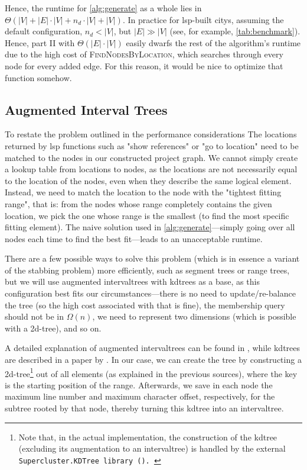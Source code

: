 \documentclass[../thesis]{subfiles}
\begin{document}
Hence, the runtime for \cref{alg:generate} as a whole lies in $\Theta(|V| + |E| \cdot |V| + n_d \cdot |V| + |V|)$.
In practice for \gls{lsp}-built \glspl{city}, assuming the default configuration, $n_d < |V|$, but $|E| \gg |V|$ (see, for example, \cref{tab:benchmark}).
Hence, part II with $\Theta(|E| \cdot |V|)$ easily dwarfs the rest of the algorithm's runtime due to the high cost of \textsc{FindNodesByLocation}, which searches through every node for every added edge.
For this reason, it would be nice to optimize that function somehow.

\subsection{Augmented Interval Trees}\label{subsec:kd}
To restate the problem outlined in the performance considerations 
The locations returned by \gls{lsp} functions such as "show references" or "go to location" need to be matched to the nodes in our constructed project graph.
We cannot simply create a lookup table from locations to nodes, as the locations are not necessarily equal to the location of the nodes, even when they describe the same logical element.
Instead, we need to match the location to the node with the "tightest fitting range",
that is: from the nodes whose \gls{range} completely contains the given location, we pick the one whose \gls{range} is the smallest (to find the most specific fitting element).
The naive solution used in \cref{alg:generate}---simply going over all nodes each time to find the best fit---leads to an unacceptable runtime.

There are a few possible ways to solve this problem (which is in essence a variant of the stabbing problem) more efficiently, such as segment trees or range trees, but we will use augmented \glspl{intervaltree} with \glspl{kdtree} as a base, as this configuration best fits our circumstances—there is no need to update/re-balance the tree (so the high cost associated with that is fine), the membership query should not be in $\Omega(n)$, we need to represent two dimensions (which is possible with a 2d-tree), and so on.

A detailed explanation of augmented \glspl{intervaltree} can be found in \textcite[section~17.3]{cormen2022}, while \glspl{kdtree} are described in a paper by \textcite{bentley1975}.
In our case, we can create the tree by constructing a 2d-tree\footnote{
	Note that, in the actual implementation, the construction of the \gls{kdtree} (excluding its augmentation to an \gls{intervaltree}) is handled by the external \tt{Supercluster.KDTree} library ().
} out of all elements (as explained in the previous sources), where the key is the starting position of the \gls{range}.
Afterwards, we save in each node the maximum line number and maximum character offset, respectively, for the subtree rooted by that node, thereby turning this \gls{kdtree} into an \gls{intervaltree}.
\end{document}
